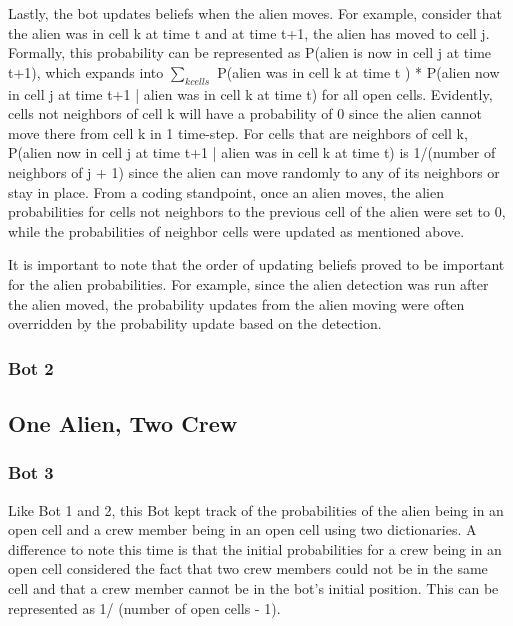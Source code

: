 \documentclass[11pt]{article}
\begin{document}
\medskip

Lastly, the bot updates beliefs when the alien moves. For example, consider that the alien was in cell k at time t and at time t+1, the alien has moved to cell j. Formally, this probability can be represented as P(alien is now in cell j at time t+1), which expands into $\sum_{k cells}$ P(alien was in cell k at time t ) * P(alien now in cell j at time t+1 | alien was in cell k at time t) for all open cells. Evidently, cells not neighbors of cell k will have a probability of 0 since the alien cannot move there from cell k in 1 time-step. For cells that are neighbors of cell k, P(alien now in cell j at time t+1 | alien was in cell k at time t) is 1/(number of neighbors of j + 1) since the alien can move randomly to any of its neighbors or stay in place. From a coding standpoint, once an alien moves, the alien probabilities for cells not neighbors to the previous cell of the alien were set to 0, while the probabilities of neighbor cells were updated as mentioned above. 

\medskip

It is important to note that the order of updating beliefs proved to be important for the alien probabilities. For example, since the alien detection was run after the alien moved, the probability updates from the alien moving were often overridden by the probability update based on the detection. 

\subsubsection{Bot 2}

\subsection{One Alien, Two Crew}

\subsubsection{Bot 3}
Like Bot 1 and 2, this Bot kept track of the probabilities of the alien being in an open cell and a crew member being in an open cell using two dictionaries. A difference to note this time is that the initial probabilities for a crew being in an open cell considered the fact that two crew members could not be in the same cell and that a crew member cannot be in the bot's initial position. This can be represented as 1/ (number of open cells - 1). 

\medskip
\end{document}

